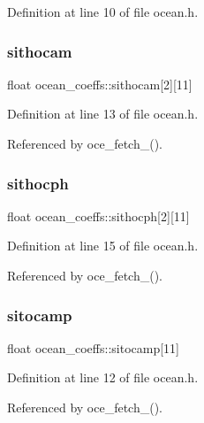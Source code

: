 Definition at line 10 of file ocean.\+h.

\mbox{\label{structocean__coeffs_ab29e9de9ddc0e54236d18095651fa0ae}} 
\subsubsection{\texorpdfstring{sithocam}{sithocam}}
{\footnotesize\ttfamily float ocean\+\_\+coeffs\+::sithocam\mbox{[}2\mbox{]}\mbox{[}11\mbox{]}}



Definition at line 13 of file ocean.\+h.



Referenced by oce\+\_\+fetch\+\_\+().

\mbox{\label{structocean__coeffs_a275a2b32e7ed67b17a89e4aa5206e71b}} 
\subsubsection{\texorpdfstring{sithocph}{sithocph}}
{\footnotesize\ttfamily float ocean\+\_\+coeffs\+::sithocph\mbox{[}2\mbox{]}\mbox{[}11\mbox{]}}



Definition at line 15 of file ocean.\+h.



Referenced by oce\+\_\+fetch\+\_\+().

\mbox{\label{structocean__coeffs_a0fcf77d9737d663f002d9e4850526d65}} 
\subsubsection{\texorpdfstring{sitocamp}{sitocamp}}
{\footnotesize\ttfamily float ocean\+\_\+coeffs\+::sitocamp\mbox{[}11\mbox{]}}



Definition at line 12 of file ocean.\+h.



Referenced by oce\+\_\+fetch\+\_\+().

